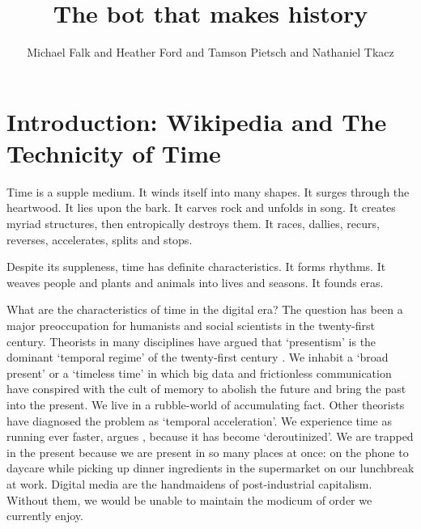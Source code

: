 \documentclass[
  Crown,
  times,
  sageh]{sagej}
\title{The bot that makes history}
\author{Michael Falk\affilnum{1} and Heather Ford\affilnum{2} and Tamson
Pietsch\affilnum{3} and Nathaniel Tkacz\affilnum{4}}
\affiliation{
    \affilnum{1} University of Melbourne \\
    \affilnum{2} University of Technology, Sydney \\
    \affilnum{3} Goldsmiths, University of London \\
  }
\begin{document}
\maketitle


\maketitle

\section{Introduction: Wikipedia and The Technicity of
Time}\label{introduction-wikipedia-and-the-technicity-of-time}

Time is a supple medium. It winds itself into many shapes. It surges
through the heartwood. It lies upon the bark. It carves rock and unfolds
in song. It creates myriad structures, then entropically destroys them.
It races, dallies, recurs, reverses, accelerates, splits and stops.

Despite its suppleness, time has definite characteristics. It forms
rhythms. It weaves people and plants and animals into lives and seasons.
It founds eras.

What are the characteristics of time in the digital era? The question
has been a major preoccupation for humanists and social scientists in
the twenty-first century. Theorists in many disciplines have argued that
`presentism' is the dominant `temporal regime' of the twenty-first
century \citep{assmann_is_2020, hartog_regimes_2017}. We inhabit a
`broad present' \citep{gumbrecht_our_2014} or a `timeless time'
\citep{castells_rise_2010} in which big data and frictionless
communication have conspired with the cult of memory to abolish the
future and bring the past into the present. We live in a rubble-world of
accumulating fact. Other theorists have diagnosed the problem as
`temporal acceleration'. We experience time as running ever faster,
argues \citet[77]{wajcman_pressed_2015}, because it has become
`deroutinized'. We are trapped in the present because we are present in
so many places at once: on the phone to daycare while picking up dinner
ingredients in the supermarket on our lunchbreak at work. Digital media
are the handmaidens of post-industrial capitalism. Without them, we
would be unable to maintain the modicum of order we currently enjoy.
\end{document}
